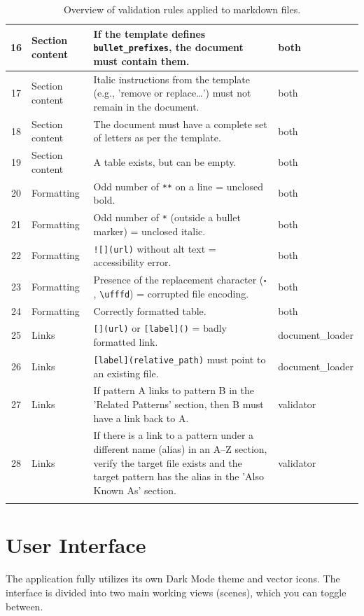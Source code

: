 \documentclass[12pt, a4paper]{article}
\begin{document}
\begin{small}
\begin{longtable}{|c|p{3.0cm}|p{8.5cm}|p{2.5cm}|}
16 & Section content & If the template defines \texttt{bullet\_prefixes}, the document must contain them. & both \\ \hline
17 & Section content & Italic instructions from the template (e.g., 'remove or replace\ldots') must not remain in the document. & both \\ \hline
18 & Section content & The document must have a complete set of letters as per the template. & both \\ \hline
19 & Section content & A table exists, but can be empty. & both \\ \hline
20 & Formatting & Odd number of \texttt{**} on a line = unclosed bold. & both \\ \hline
21 & Formatting & Odd number of \texttt{*} (outside a bullet marker) = unclosed italic. & both \\ \hline
22 & Formatting & \texttt{![](url)} without alt text = accessibility error. & both \\ \hline
23 & Formatting & Presence of the replacement character ($\square$, \texttt{\textbackslash ufffd}) = corrupted file encoding. & both \\ \hline
24 & Formatting & Correctly formatted table. & both \\ \hline
25 & Links & \texttt{[](url)} or \texttt{[label]()} = badly formatted link. & document\_loader \\ \hline
26 & Links & \texttt{[label](relative\_path)} must point to an existing file. & document\_loader \\ \hline
27 & Links & If pattern A links to pattern B in the 'Related Patterns' section, then B must have a link back to A. & validator \\ \hline
28 & Links & If there is a link to a pattern under a different name (alias) in an A--Z section, verify the target file exists and the target pattern has the alias in the 'Also Known As' section. & validator \\ \hline

\caption{Overview of validation rules applied to markdown files.}
\label{tab:validation-rules}
\end{longtable}
\end{small}
\renewcommand{\arraystretch}{1.0}

\section{User Interface}

The application fully utilizes its own Dark Mode theme and vector icons. The interface is divided 
into two main working views (scenes), which you can toggle between.
\end{document}
